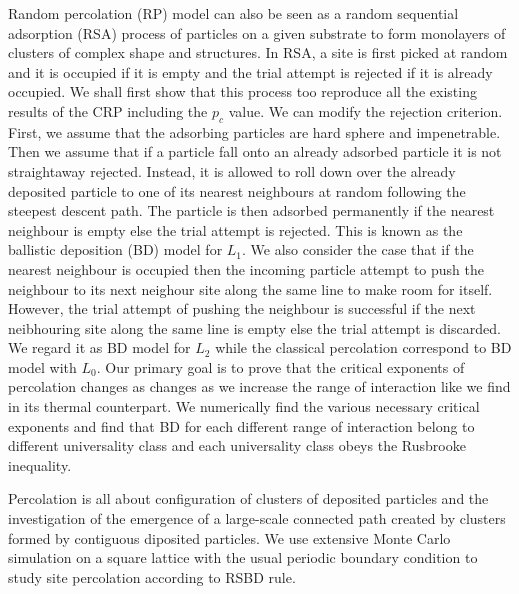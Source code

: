 	Random percolation (RP) model can also be seen as a random sequential adsorption (RSA) \cite{Jullien1992} process of particles on a given substrate to form monolayers of clusters of complex shape and structures. In RSA, a site is first picked at random and it is occupied if it is empty and the trial attempt is rejected if it is already occupied. We shall first show that this process too reproduce all the existing results of the CRP including the $p_c$ value. We can modify the rejection criterion. First, we assume that the adsorbing particles are hard sphere and impenetrable. Then we assume that if a particle fall onto an already adsorbed particle it is not straightaway rejected. Instead, it is allowed to roll down over the already deposited particle to one of its nearest neighbours at random following the steepest descent path. The particle is then adsorbed permanently if the nearest neighbour is empty else the trial attempt is rejected. This is known as the ballistic deposition (BD) \cite{Choi1995, Talbot1992, Jullien1992, Viot1993} model for $L_1$. We also consider the case that if the nearest neighbour is occupied then the incoming particle attempt to push the neighbour to its next neighour site along the same line to make room for itself. However, the trial attempt of pushing the neighbour is successful if the next neibhouring site along the same line is empty else the trial attempt is discarded. We regard it as BD model for $L_2$ while the classical percolation correspond to BD model with $L_0$. Our primary goal is to prove that the critical exponents of percolation changes as changes as we increase the range of interaction like we find in its thermal counterpart. We numerically find the various necessary critical exponents and find that BD for each different range of interaction belong to different universality class and each universality class obeys the Rusbrooke inequality.
	
	Percolation is all about configuration of clusters of deposited particles and the investigation of the emergence of a large-scale connected path created by clusters formed by contiguous diposited particles. We use extensive Monte Carlo simulation on a square lattice with the usual periodic boundary condition to study site percolation according to RSBD rule.\\
	
